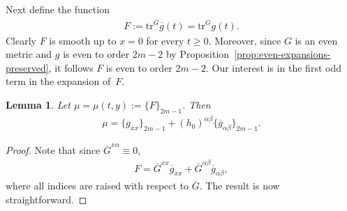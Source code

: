 \documentclass[pdftex]{sigma}
\numberwithin{equation}{section}
\newtheorem{Lemma}[Theorem]{Lemma}
\newcommand{\olg}{\overline{g}}
\newcommand{\olG}{\overline{G}}
\newcommand{\tr}{\mathrm{tr}}
\begin{document}
Next define the function
\begin{gather*}%
F := \tr^{\olG} \olg(t) = \tr^{G} g(t).
\end{gather*}
Clearly $F$ is smooth up to $x=0$ for every $t \geq 0$. Moreover, since $G$ is an even metric and $g$ is even to order $2m-2$ by Proposition~\ref{prop:even-expansions-preserved}, it follows $F$ is even to order $2m-2$. Our interest is in the first odd term in the expansion of~$F$.

\begin{Lemma}\label{lemma3.2} Let $\mu = \mu(t,y) := \{F\}_{2m-1}$. Then
\begin{gather*}%
\mu = \{\olg_{xx}\}_{2m-1} + (h_0)^{\alpha\beta} \{\olg_{\alpha \beta} \}_{2m-1}.
\end{gather*}
\end{Lemma}
\begin{proof}
Note that since $\olG^{x\alpha} \equiv 0$,
\begin{gather*}
\label{eq3.4}
F = \olG^{xx}\olg_{xx} + \olG^{\alpha \beta} \olg_{\alpha \beta},
\end{gather*}
where all indices are raised with respect to $\olG$. The result is now straightforward.
\end{proof}
\end{document}
